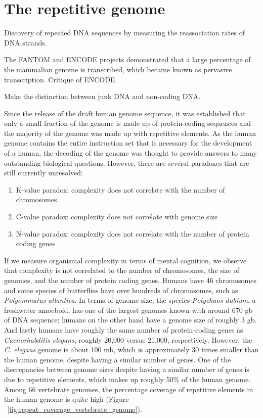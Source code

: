 \section{The repetitive genome}

Discovery of repeated DNA sequences\cite{Britten1968} by measuring the reassociation rates of DNA strands.

The FANTOM and ENCODE projects demonstrated that a large percentage of the mammalian genome is transcribed, which became known as pervasive transcription\cite{pmid21765801}. Critique of ENCODE\cite{pmid23431001, pmid23479647, pmid23137679}.

Make the distinction between junk DNA and non-coding DNA.

Since the release of the draft human genome sequence\cite{venter2001sequence, lander2001initial}, it was established that only a small fraction of the genome is made up of protein-coding sequences and the majority of the genome was made up with repetitive elements. As the human genome contains the entire instruction set that is necessary for the development of a human, the decoding of the genome was thought to provide answers to many outstanding biological questions. However, there are several paradoxes that are still currently unresolved:

\begin{enumerate}
   \item K-value paradox: complexity does not correlate with the number of chromosomes
   \item C-value paradox: complexity does not correlate with genome size
   \item N-value paradox: complexity does not correlate with the number of protein coding genes
\end{enumerate}

If we measure organismal complexity in terms of mental cognition, we observe that complexity is not correlated to the number of chromosomes, the size of genomes, and the number of protein coding genes. Humans have 46 chromosomes and some species of butterflies have over hundreds of chromosomes, such as \textit{Polyommatus atlantica}. In terms of genome size, the species \textit{Polychaos dubium}, a freshwater amoeboid, has one of the largest genomes known with around 670 gb of DNA sequence; humans on the other hand have a genome size of roughly 3 gb. And lastly humans have roughly the same number of protein-coding genes as \textit{Caenorhabditis elegans}, roughly 20,000 versus 21,000, respectively. However, the \textit{C. elegans} genome is about 100 mb\cite{celegans1998sequencing}, which is approximately 30 times smaller than the human genome, despite having a similar number of genes. One of the discrepancies between genome sizes despite having a similar number of genes is due to repetitive elements, which makes up roughly 50\% of the human genome. Among 66 vertebrate genomes, the percentage coverage of repetitive elements in the human genome is quite high (Figure ~\ref{fig:repeat_coverage_vertebrate_genome}).


